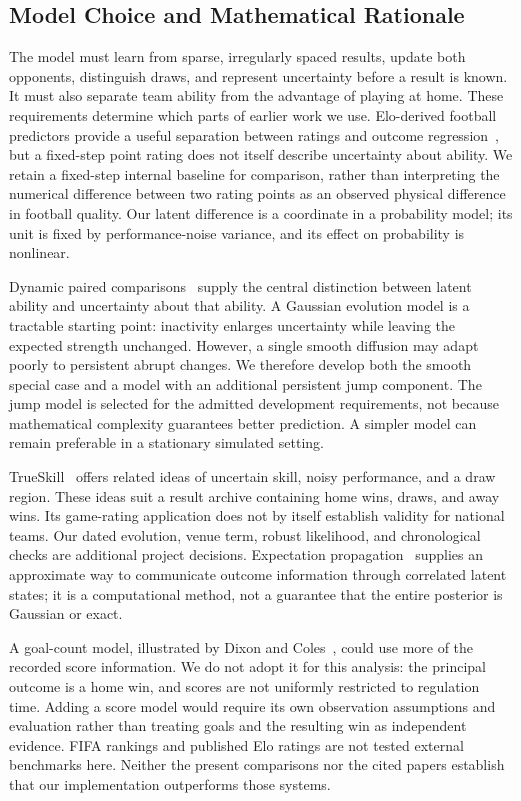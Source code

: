 \subsection{Model Choice and Mathematical Rationale}
\label{sec:model-choice}

The model must learn from sparse, irregularly spaced results, update both opponents, distinguish draws, and represent uncertainty before a result is known. It must also separate team ability from the advantage of playing at home. These requirements determine which parts of earlier work we use. Elo-derived football predictors provide a useful separation between ratings and outcome regression~\cite{hvattum2010elo}, but a fixed-step point rating does not itself describe uncertainty about ability. We retain a fixed-step internal baseline for comparison, rather than interpreting the numerical difference between two rating points as an observed physical difference in football quality. Our latent difference is a coordinate in a probability model; its unit is fixed by performance-noise variance, and its effect on probability is nonlinear.

Dynamic paired comparisons~\cite{glickman1999dynamic} supply the central distinction between latent ability and uncertainty about that ability. A Gaussian evolution model is a tractable starting point: inactivity enlarges uncertainty while leaving the expected strength unchanged. However, a single smooth diffusion may adapt poorly to persistent abrupt changes. We therefore develop both the smooth special case and a model with an additional persistent jump component. The jump model is selected for the admitted development requirements, not because mathematical complexity guarantees better prediction. A simpler model can remain preferable in a stationary simulated setting.

TrueSkill~\cite{herbrich2006trueskill} offers related ideas of uncertain skill, noisy performance, and a draw region. These ideas suit a result archive containing home wins, draws, and away wins. Its game-rating application does not by itself establish validity for national teams. Our dated evolution, venue term, robust likelihood, and chronological checks are additional project decisions. Expectation propagation~\cite{minka2001ep} supplies an approximate way to communicate outcome information through correlated latent states; it is a computational method, not a guarantee that the entire posterior is Gaussian or exact.

A goal-count model, illustrated by Dixon and Coles~\cite{dixon1997scores}, could use more of the recorded score information. We do not adopt it for this analysis: the principal outcome is a home win, and scores are not uniformly restricted to regulation time. Adding a score model would require its own observation assumptions and evaluation rather than treating goals and the resulting win as independent evidence. FIFA rankings and published Elo ratings are not tested external benchmarks here. Neither the present comparisons nor the cited papers establish that our implementation outperforms those systems.

